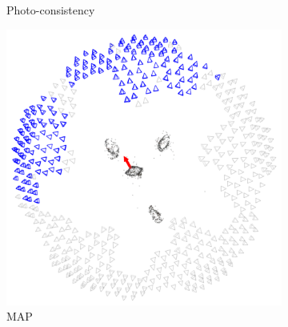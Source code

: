 \begin{figure}[t]
\begin{subfigure}{0.3\textwidth}
		\caption{Photo-consistency}
	\end{subfigure}
	\begin{subfigure}{0.3\textwidth}	
		\includegraphics[width=\textwidth]{figures/MAP}
		\caption{MAP}
	\end{subfigure}\\
		\begin{subfigure}{0.3\textwidth}

\end{subfigure}
\end{figure}
